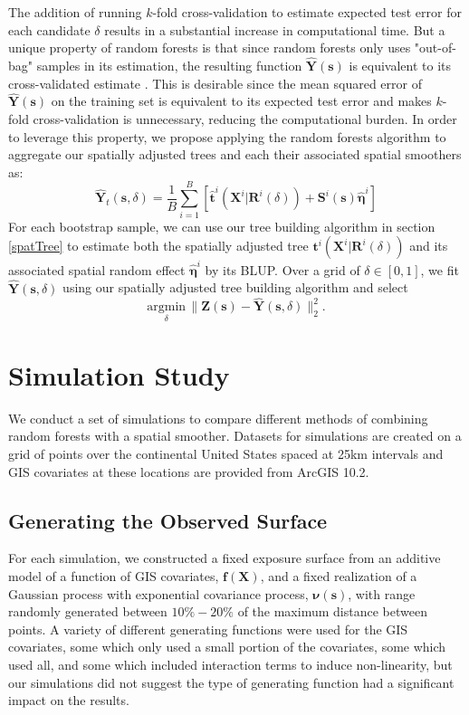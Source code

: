 \documentclass[12pt]{article}
\newcommand{\covs}{\mathbf{X}}
\newcommand{\obs}{\mathbf{Z}(\mathbf{s})}
\newcommand{\forest}{\mathbf{f}({\covs})}
\newcommand{\spproc}{\boldsymbol{\nu}(\mathbf{s})}
\newcommand{\estre}{\boldsymbol{\hat \eta}}
\begin{document}
The addition of running $k$-fold cross-validation to estimate expected test error for each candidate $\delta$ results in a substantial increase in computational time. But a unique property of random forests is that since random forests only uses "out-of-bag" samples in its estimation, the resulting function $\mathbf{\hat Y} (\mathbf{s})$ is equivalent to its cross-validated estimate \cite{hastie2005elements}. This is desirable since the mean squared error of $ \mathbf{\hat Y} (\mathbf{s})$ on the training set is equivalent to its expected test error and makes $k$-fold cross-validation is unnecessary, reducing the computational burden. In order to leverage this property, we propose applying the random forests algorithm to aggregate our spatially adjusted trees and each their associated spatial smoothers as:
$$\mathbf{\hat Y}_t(\mathbf{s},\delta) = \frac{1}{B} \sum\limits_{i=1}^B \left[ \mathbf{\hat t}^i\left( \covs^i|\mathbf{R}^i(\delta) \right) + \mathbf{S}^i(\mathbf{s}) \estre^i \right] $$
For each bootstrap sample, we can use our tree building algorithm in section \ref{spatTree} to estimate both the spatially adjusted tree $\mathbf{t}^i\left( \covs^i|\mathbf{R}^i(\delta) \right)$ and its associated spatial random effect $\estre^i$ by its BLUP. Over a grid of $\delta \in [0,1]$, we fit $\mathbf{\hat Y}(\mathbf{s},\delta)$ using our spatially adjusted tree building algorithm and select $$\underset{\delta}{\text{argmin}} \,\|\obs-\mathbf{\hat Y}(\mathbf{s},\delta)\|_2^2.$$ 

\section{Simulation Study}

We conduct a set of simulations to compare different methods of combining random forests with a spatial smoother. Datasets for simulations are created on a grid of points over the continental United States spaced at 25km intervals and GIS covariates at these locations are provided from ArcGIS 10.2. 

\subsection{Generating the Observed Surface}
For each simulation, we constructed a fixed exposure surface from an additive model of a function of GIS covariates, $\forest$, and a fixed realization of a Gaussian process with exponential covariance process, $\spproc$, with range randomly generated between $10\% - 20\%$ of the maximum distance between points.  A variety of different generating functions were used for the GIS covariates, some which only used a small portion of the covariates, some which used all, and some which included interaction terms to induce non-linearity, but our simulations did not suggest the type of generating function had a significant impact on the results.
\end{document}
